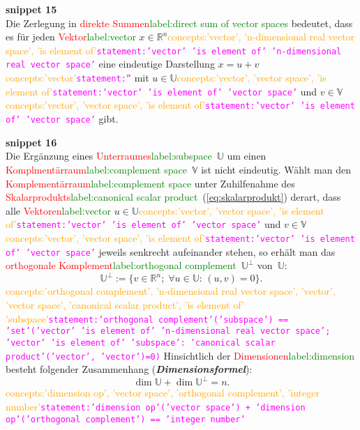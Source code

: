 \documentclass[a4paper,twoside,english,ngerman,deutsch,german,sectrefs,envcountsame,envcountchap]{svmono}
\newcommand{\setref}[2]{\textcolor{red}{#1}\textcolor{green}{#2}}
\newcommand{\snippet}[1]{\textbf{snippet #1}\\}
\newcommand{\eqnote}[2]{\textcolor{orange}{#1}\textcolor{magenta}{\texttt{#2}}}
\begin{document}
\snippet{15}
Die Zerlegung in \setref{direkte Summen}{label:direct sum of vector spaces} bedeutet, dass es für jeden \setref{Vektor}{label:vector} $x\in{\mathbb{R}}^{n}$\eqnote{concepts:'vector', 'n-dimensional real vector space', 'is element of'}{statement:'vector' 'is element of' 'n-dimensional real vector space'} eine eindeutige Darstellung $x=u+v$\eqnote{concepts:'vector'}{statement:''} mit $u\in\mathbb{U}$\eqnote{concepts:'vector', 'vector space', 'is element of'}{statement:'vector' 'is element of' 'vector space'} und $v\in\mathbb{V}$\eqnote{concepts:'vector', 'vector space', 'is element of'}{statement:'vector' 'is element of' 'vector space'} gibt.

\snippet{16}
Die Ergänzung eines \setref{Unterraumes}{label:subspace}~$\mathbb{U}$ um einen \setref{Komplmentärraum}{label:complement space}~$\mathbb{V}$ ist nicht eindeutig. Wählt man den \setref{Komplementärraum}{label:complement space} unter Zuhilfenahme des \setref{Skalarprodukts}{label:canonical scalar product}~(\eqref{eq:skalarprodukt}) derart, dass alle \setref{Vektoren}{label:vector} $u\in\mathbb{U}$\eqnote{concepts:'vector', 'vector space', 'is element of'}{statement:'vector' 'is element of' 'vector space'} und $v\in\mathbb{V}$\eqnote{concepts:'vector', 'vector space', 'is element of'}{statement:'vector' 'is element of' 'vector space'} jeweils senkrecht aufeinander stehen, so erhält man das \setref{orthogonale Komplement}{label:orthogonal complement}~$\mathbb{U}^{\perp}$ von~$\mathbb{U}$:
\begin{equation}
\mathbb{U}^{\perp}:=\{v\in{\mathbb{R}}^{n};\;\forall u\in\mathbb{U}:\,(u,v)=0\}.\label{eq:ortho-komplement}
\end{equation}\eqnote{concepts:'orthogonal complement', 'n-dimensional real vector space', 'vector', 'vector space', 'canonical scalar product', 'is element of' 'subspace'}{statement:'orthogonal complement'('subspace') == 'set'('vector' 'is element of' 'n-dimensional real vector space'; 'vector' 'is element of' 'subspace': 'canonical scalar product'('vector', 'vector')=0)}
Hinsichtlich der \setref{Dimensionen}{label:dimension} besteht folgender Zusammenhang (\textbf{\em Dimensionsformel}):
\begin{equation}
\dim\mathbb{U}+\dim\mathbb{U}^{\perp}=n.\label{eq:dimensionsformel-ortho-kompl}
\end{equation}\eqnote{concepts:'dimension op', 'vector space', 'orthogonal complement', 'integer number'}{statement:'dimension op'('vector space') + 'dimension op'('orthogonal complement') == 'integer number'}
\end{document}
